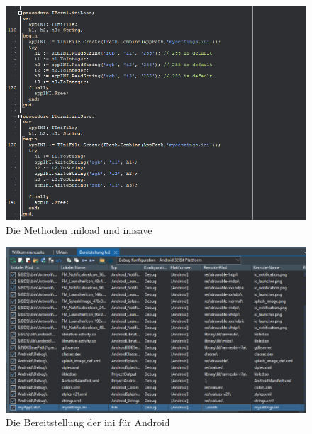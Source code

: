 \begin{figure}[h]
\begin{center}
\includegraphics[width=15cm]{img/iniloadsave.png}
\caption{Die Methoden iniload und inisave}
\label{iniloadsave}
\end{center}
\end{figure}

\begin{figure}[h]
\begin{center}
\includegraphics[width=15cm]{img/bereitstellung.png}
\caption{Die Bereitstellung der ini für Android}
\label{bereitstellung}
\end{center}
\end{figure}

